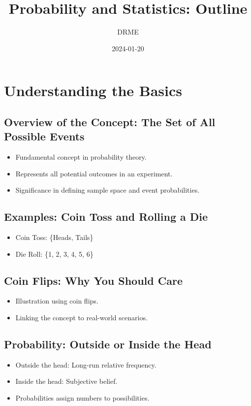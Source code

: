 \documentclass{article}
\title{Probability and Statistics: Outline}
\author{DRME}
\date{2024-01-20}
\begin{document}
\maketitle

\section*{Understanding the Basics}

\subsection*{Overview of the Concept: The Set of All Possible Events}
\begin{itemize}
  \item Fundamental concept in probability theory.
  \item Represents all potential outcomes in an experiment.
  \item Significance in defining sample space and event probabilities.
\end{itemize}

\subsection*{Examples: Coin Toss and Rolling a Die}
\begin{itemize}
  \item Coin Toss: \{Heads, Tails\}
  \item Die Roll: \{1, 2, 3, 4, 5, 6\}
\end{itemize}

\subsection*{Coin Flips: Why You Should Care}
\begin{itemize}
  \item Illustration using coin flips.
  \item Linking the concept to real-world scenarios.
\end{itemize}

\subsection*{Probability: Outside or Inside the Head}
\begin{itemize}
  \item Outside the head: Long-run relative frequency.
  \item Inside the head: Subjective belief.
  \item Probabilities assign numbers to possibilities.
\end{itemize}
\end{document}
